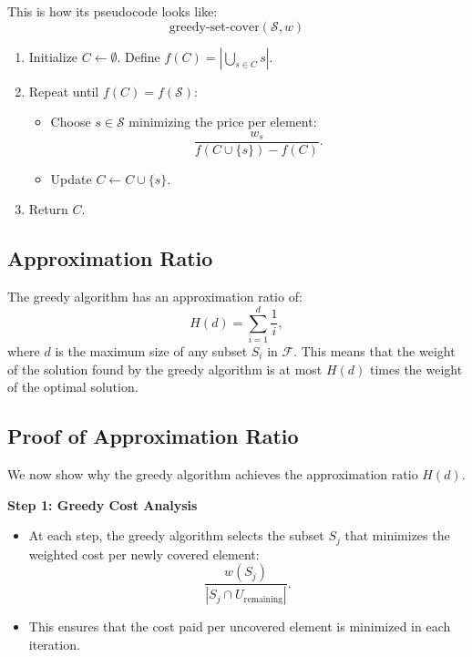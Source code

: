 \documentclass[10pt,letter,notitlepage]{article}
\begin{document}
\begin{Answer}
\begin{tcolorbox}[colframe=cyan, colback=white, title=Greedy Algorithm]
This is how its pseudocode looks like:
\[
\text{greedy-set-cover}(\mathcal{S}, w)
\]
\begin{enumerate}
    \item Initialize \(C \gets \emptyset\). Define \(f(C) = \left| \bigcup_{s \in C} s \right|\).
    \item Repeat until \(f(C) = f(\mathcal{S})\):
    \begin{itemize}
        \item Choose \(s \in \mathcal{S}\) minimizing the price per element:
        \[
        \frac{w_s}{f(C \cup \{s\}) - f(C)}.
        \]
        \item Update \(C \gets C \cup \{s\}\).
    \end{itemize}
    \item Return \(C\).
\end{enumerate}
\end{tcolorbox}

\subsection*{Approximation Ratio}

The greedy algorithm has an approximation ratio of:
\[
H(d) = \sum_{i=1}^d \frac{1}{i},
\]
where \(d\) is the maximum size of any subset \(S_i\) in \(\mathcal{F}\). This means that the weight of the solution found by the greedy algorithm is at most \(H(d)\) times the weight of the optimal solution.

\subsection*{Proof of Approximation Ratio}

We now show why the greedy algorithm achieves the approximation ratio \(H(d)\).

\textbf{Step 1: Greedy Cost Analysis}
\begin{itemize}
    \item At each step, the greedy algorithm selects the subset \(S_j\) that minimizes the weighted cost per newly covered element:
    \[
    \frac{w(S_j)}{|S_j \cap U_{\text{remaining}}|}.
    \]
    \item This ensures that the cost paid per uncovered element is minimized in each iteration.
\end{itemize}


\end{Answer}
\end{document}
